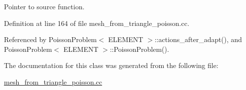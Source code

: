 Pointer to source function. 



Definition at line 164 of file mesh\+\_\+from\+\_\+triangle\+\_\+poisson.\+cc.



Referenced by Poisson\+Problem$<$ E\+L\+E\+M\+E\+N\+T $>$\+::actions\+\_\+after\+\_\+adapt(), and Poisson\+Problem$<$ E\+L\+E\+M\+E\+N\+T $>$\+::\+Poisson\+Problem().



The documentation for this class was generated from the following file\+:\begin{DoxyCompactItemize}
\item 
\hyperlink{mesh__from__triangle__poisson_8cc}{mesh\+\_\+from\+\_\+triangle\+\_\+poisson.\+cc}\end{DoxyCompactItemize}

